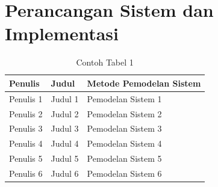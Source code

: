 \section{Perancangan Sistem dan Implementasi}
\lipsum[1]

\begin{table}[H]
    \centering
    \caption{Contoh Tabel 1}
    \label{t risetPemodelan}
    \begin{tabularx}{\linewidth}{
        |p{}%
        |p{}%
        |p{}|%
    }
        \hline
        Penulis & Judul & Metode Pemodelan Sistem\\ \hline
        Penulis 1 & Judul 1 & Pemodelan Sistem 1 \\ \hline
        Penulis 2 & Judul 2 & Pemodelan Sistem 2 \\ \hline
        Penulis 3 & Judul 3 & Pemodelan Sistem 3 \\ \hline
        Penulis 4 & Judul 4 & Pemodelan Sistem 4 \\ \hline
        Penulis 5 & Judul 5 & Pemodelan Sistem 5 \\ \hline
        Penulis 6 & Judul 6 & Pemodelan Sistem 6 \\ \hline
    \end{tabularx}
\end{table}
